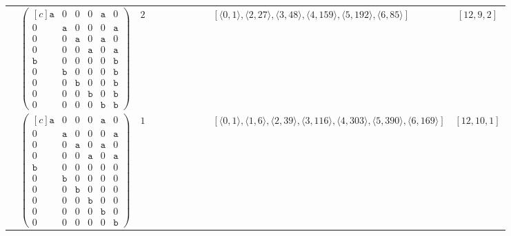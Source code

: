 \documentclass[12pt]{article}
\theoremstyle{definition}
\theoremstyle{plain}
\begin{document}
{\begin{longtable}{@{}cYcccccccZc@{}}
& $\begin{pmatrix*}[c]
\mathtt{a}  &  0  &  0  &  0  &  \mathtt{a}  &  0  \\
0  &  \mathtt{a}  &  0  &  0  &  0  &  \mathtt{a}  \\
0  &  0  &  \mathtt{a}  &  0  &  \mathtt{a}  &  0  \\
0  &  0  &  0  &  \mathtt{a}  &  0  &  \mathtt{a}  \\
\mathtt{b}  &  0  &  0  &  0  &  0  &  \mathtt{b}  \\
0  &  \mathtt{b}  &  0  &  0  &  0  &  \mathtt{b}  \\
0  &  0  &  \mathtt{b}  &  0  &  0  & \mathtt{b}   \\
0  &  0  &  0  &  \mathtt{b}  &  0   &  \mathtt{b}  \\
0  &  0  &  0  &  0  &  \mathtt{b}   &  \mathtt{b}
\end{pmatrix*}$
& $2$
&
&
&
&
&
&
& $[\langle0,1\rangle,\allowbreak\langle2,27\rangle,\allowbreak\langle3,48\rangle,\allowbreak\langle4,159\rangle,\allowbreak\langle5,192\rangle,\allowbreak\langle6,85\rangle]$
& $[12,9,2]$\\

\cmidrule(lr){2-11}


& $\begin{pmatrix*}[c]
\mathtt{a}  &  0  &  0  &  0  &  \mathtt{a}  &  0  \\
0  &  \mathtt{a}  &  0  &  0  &  0  &  \mathtt{a}  \\
0  &  0  &  \mathtt{a}  &  0  &  \mathtt{a}  &  0  \\
0  &  0  &  0  &  \mathtt{a}  &  0  &  \mathtt{a}  \\
\mathtt{b}  &  0  &  0  &  0  &  0  &  0  \\
0  &  \mathtt{b}  &  0  &  0  &  0  & 0  \\
0  &  0  &  \mathtt{b}  &  0  &  0  & 0   \\
0  &  0  &  0  &  \mathtt{b}  &  0   &  0  \\
0  &  0  &  0  &  0  &  \mathtt{b}   &  0  \\
0  &  0  &  0  &  0  &  0   &  \mathtt{b}
\end{pmatrix*}$
& $1$
&
&
&
&
&
&
& $[\langle0,1\rangle,\allowbreak\langle1,6\rangle,\allowbreak\langle2,39\rangle,\allowbreak\langle3,116\rangle,\allowbreak\langle4,303\rangle,\allowbreak\langle5,390\rangle,\allowbreak\langle6,169\rangle]$
& $[12,10,1]$     \\



\end{longtable}}
\end{document}
